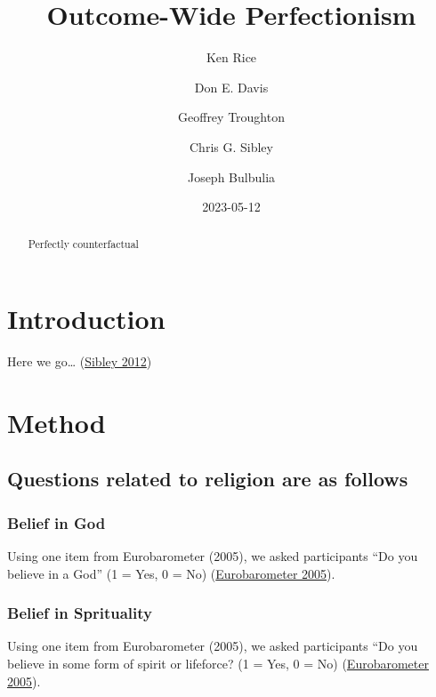 \documentclass[
  singlecolumn]{report}
\title{Outcome-Wide Perfectionism}
\author{Ken Rice \and Don E. Davis \and Geoffrey Troughton \and Chris G.
Sibley \and Joseph Bulbulia}
\date{2023-05-12}
\begin{document}
\maketitle
\begin{abstract}
Perfectly counterfactual
\end{abstract}
\ifdefined\Shaded\renewenvironment{Shaded}{\begin{tcolorbox}[boxrule=0pt, sharp corners, enhanced, frame hidden, borderline west={3pt}{0pt}{shadecolor}, breakable, interior hidden]}{\end{tcolorbox}}\fi

\listoffigures
\listoftables
\hypertarget{introduction}{%
\section{Introduction}\label{introduction}}

Here we go\ldots{} (\protect\hyperlink{ref-sibley2012}{Sibley 2012})

\hypertarget{method}{%
\section{Method}\label{method}}

\hypertarget{questions-related-to-religion-are-as-follows}{%
\subsection{Questions related to religion are as
follows}\label{questions-related-to-religion-are-as-follows}}

\hypertarget{belief-in-god}{%
\subsubsection{Belief in God}\label{belief-in-god}}

Using one item from Eurobarometer (2005), we asked participants ``Do you
believe in a God'' (1 = Yes, 0 = No)
(\protect\hyperlink{ref-eurobarometer2005b}{Eurobarometer 2005}).

\hypertarget{belief-in-sprituality}{%
\subsubsection{Belief in Sprituality}\label{belief-in-sprituality}}

Using one item from Eurobarometer (2005), we asked participants ``Do you
believe in some form of spirit or lifeforce? (1 = Yes, 0 = No)
(\protect\hyperlink{ref-eurobarometer2005b}{Eurobarometer 2005}).
\end{document}

